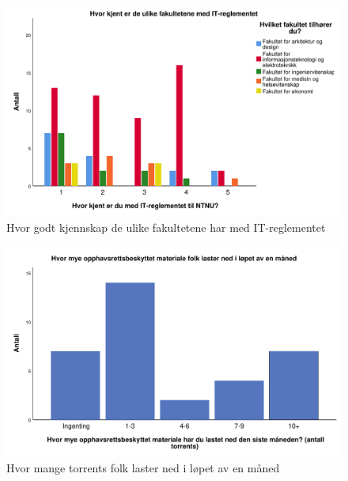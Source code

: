 \begin{figure}[H]
    \centering
    \includegraphics[scale=0.45]{case_1/bilder/reglement_fakultet.pdf}
    \caption[Forskjellen mellom fakultetene og kjennskap til IT-reglement]{Hvor godt kjennskap de ulike fakultetene har med IT-reglementet}
    \label{fig:reglement-fakultet}
\end{figure}

\begin{figure}[H]
    \centering
    \includegraphics[scale=0.45]{case_1/bilder/antalltorrents.pdf}
    \caption[Antall torrents som blir lastet ned hver måned]{Hvor mange torrents folk laster ned i løpet av en måned}
    \label{fig:antalltorrents}
\end{figure}

